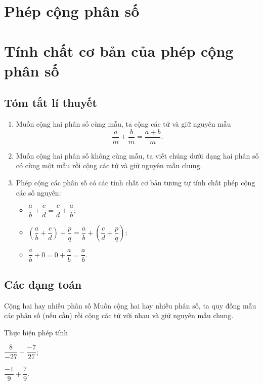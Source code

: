 \section{Phép cộng phân số}
\section{Tính chất cơ bản của phép cộng phân số}
\subsection{Tóm tắt lí thuyết}
\begin{enumerate}
	\item Muốn cộng hai phân số cùng mẫu, ta cộng các tử và giữ nguyên mẫu
	$$\dfrac{a}{m}+\dfrac{b}{m}=\dfrac{a+b}{m}.$$
	\item Muốn cộng hai phân số không cùng mẫu, ta viết chúng dưới dạng hai phân số có cùng một mẫu rồi cộng các tử và giữ nguyên mẫu chung.
	\item Phép cộng các phân số có các tính chất cơ bản tương tự tính chất phép cộng các số nguyên:		
		\begin{itemize}
			\item $\dfrac{a}{b}+\dfrac{c}{d}=\dfrac{c}{d}+\dfrac{a}{b};$
		\item 	$\left(\dfrac{a}{b}+\dfrac{c}{d}\right)+\dfrac{p}{q}=\dfrac{a}{b}+\left(\dfrac{c}{d}+\dfrac{p}{q}\right)$;
		\item 	$\dfrac{a}{b}+0=0+\dfrac{a}{b}=\dfrac{a}{b}.$
		\end{itemize}
\end{enumerate}
\subsection{Các dạng toán}
\begin{dang}{Cộng hai hay nhiều phân số}
Muốn cộng hai hay nhiều phân số, ta quy đồng mẫu các phân số (nếu cần) rồi cộng các tử với nhau và giữ nguyên mẫu chung.
\end{dang}
\begin{vd}%
Thực hiện phép tính
\begin{listEX}[2]
	\item $\dfrac{8}{-27}+\dfrac{-7}{27};$
	\item $\dfrac{-1}{9}+\dfrac{7}{9}$.
\end{listEX}
\end{vd}

